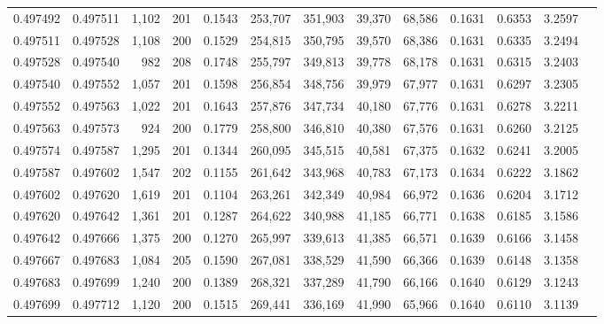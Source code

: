 \begin{tabular}{rrrrrrrrrrrrr}
0.497492 & 0.497511 & 1,102 & 201 &                                     0.1543 & 253,707 & 351,903 &  39,370 &  68,586 & 0.1631 & 0.6353 & 3.2597 \\
0.497511 & 0.497528 & 1,108 & 200 &                                     0.1529 & 254,815 & 350,795 &  39,570 &  68,386 & 0.1631 & 0.6335 & 3.2494 \\
0.497528 & 0.497540 &   982 & 208 &                                     0.1748 & 255,797 & 349,813 &  39,778 &  68,178 & 0.1631 & 0.6315 & 3.2403 \\
0.497540 & 0.497552 & 1,057 & 201 &                                     0.1598 & 256,854 & 348,756 &  39,979 &  67,977 & 0.1631 & 0.6297 & 3.2305 \\
0.497552 & 0.497563 & 1,022 & 201 &                                     0.1643 & 257,876 & 347,734 &  40,180 &  67,776 & 0.1631 & 0.6278 & 3.2211 \\
0.497563 & 0.497573 &   924 & 200 &                                     0.1779 & 258,800 & 346,810 &  40,380 &  67,576 & 0.1631 & 0.6260 & 3.2125 \\
0.497574 & 0.497587 & 1,295 & 201 &                                     0.1344 & 260,095 & 345,515 &  40,581 &  67,375 & 0.1632 & 0.6241 & 3.2005 \\
0.497587 & 0.497602 & 1,547 & 202 &                                     0.1155 & 261,642 & 343,968 &  40,783 &  67,173 & 0.1634 & 0.6222 & 3.1862 \\
0.497602 & 0.497620 & 1,619 & 201 &                                     0.1104 & 263,261 & 342,349 &  40,984 &  66,972 & 0.1636 & 0.6204 & 3.1712 \\
0.497620 & 0.497642 & 1,361 & 201 &                                     0.1287 & 264,622 & 340,988 &  41,185 &  66,771 & 0.1638 & 0.6185 & 3.1586 \\
0.497642 & 0.497666 & 1,375 & 200 &                                     0.1270 & 265,997 & 339,613 &  41,385 &  66,571 & 0.1639 & 0.6166 & 3.1458 \\
0.497667 & 0.497683 & 1,084 & 205 &                                     0.1590 & 267,081 & 338,529 &  41,590 &  66,366 & 0.1639 & 0.6148 & 3.1358 \\
0.497683 & 0.497699 & 1,240 & 200 &                                     0.1389 & 268,321 & 337,289 &  41,790 &  66,166 & 0.1640 & 0.6129 & 3.1243 \\
0.497699 & 0.497712 & 1,120 & 200 &                                     0.1515 & 269,441 & 336,169 &  41,990 &  65,966 & 0.1640 & 0.6110 & 3.1139 \\

\end{tabular}
